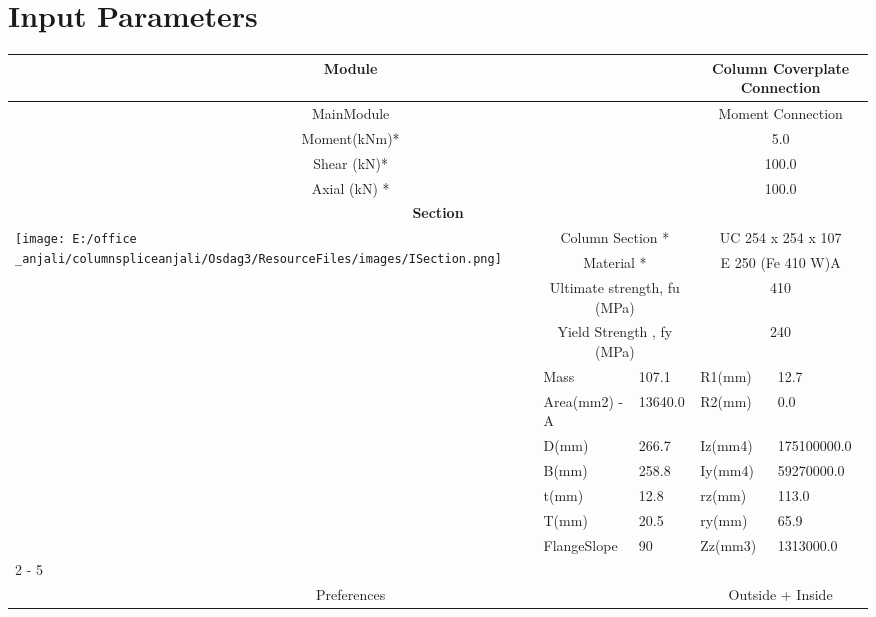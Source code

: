 \documentclass{article}%
\begin{document}
%
\normalsize%
\pagestyle{header}%
\section{Input Parameters}%
\label{sec:InputParameters}%
\renewcommand{\arraystretch}{1.2}%
\begin{longtable}{|p{5cm}|p{2cm}|p{2cm}|p{2cm}|p{5cm}|}%
\hline%
\hline%
\multicolumn{3}{|c|}{Module}&\multicolumn{2}{|c|}{Column Coverplate Connection}\\%
\hline%
\hline%
\multicolumn{3}{|c|}{MainModule}&\multicolumn{2}{|c|}{Moment Connection}\\%
\hline%
\hline%
\multicolumn{3}{|c|}{Moment(kNm)*}&\multicolumn{2}{|c|}{5.0}\\%
\hline%
\hline%
\multicolumn{3}{|c|}{Shear (kN)*}&\multicolumn{2}{|c|}{100.0}\\%
\hline%
\hline%
\multicolumn{3}{|c|}{Axial (kN) *}&\multicolumn{2}{|c|}{100.0}\\%
\hline%
\hline%
\multicolumn{5}{|c|}{\textbf{Section}}\\%
\hline%
\hline%
\multirow{11}{*}{\texttt{[image: E:/office \_anjali/columnspliceanjali/Osdag3/ResourceFiles/images/ISection.png]}}&\multicolumn{2}{|c|}{Column Section *}&\multicolumn{2}{|c|}{UC 254 x 254 x 107}\\%
\cline{2%
-%
5}%
&\multicolumn{2}{|c|}{Material *}&\multicolumn{2}{|c|}{E 250 (Fe 410 W)A}\\%
\cline{2%
-%
5}%
&\multicolumn{2}{|c|}{Ultimate strength, fu (MPa)}&\multicolumn{2}{|c|}{410}\\%
\cline{2%
-%
5}%
&\multicolumn{2}{|c|}{Yield Strength , fy (MPa)}&\multicolumn{2}{|c|}{240}\\%
\cline{2%
-%
5}%
&Mass&107.1&R1(mm)&12.7\\%
\cline{2%
-%
5}%
&Area(mm2) {-} A&13640.0&R2(mm)&0.0\\%
\cline{2%
-%
5}%
&D(mm)&266.7&Iz(mm4)&175100000.0\\%
\cline{2%
-%
5}%
&B(mm)&258.8&Iy(mm4)&59270000.0\\%
\cline{2%
-%
5}%
&t(mm)&12.8&rz(mm)&113.0\\%
\cline{2%
-%
5}%
&T(mm)&20.5&ry(mm)&65.9\\%
\cline{2%
-%
5}%
&FlangeSlope&90&Zz(mm3)&1313000.0\\%
\cline{2%
-%
5}%
\hline%
\multicolumn{5}{|c|}{\textbf{Bolt Details}}\\%
\hline%
\hline%
\multicolumn{3}{|c|}{Preferences}&\multicolumn{2}{|c|}{Outside + Inside}\\%

\end{longtable}
\end{document}

